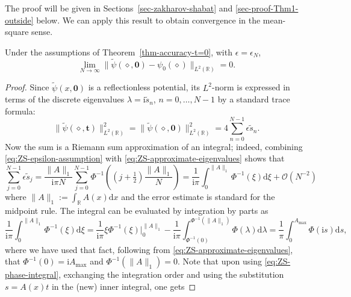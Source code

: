 \documentclass[12pt]{amsart}
\numberwithin{equation}{section}
\newcommand{\dd}{\mathrm{d}}
\newcommand{\ii}{\mathrm{i}}
\newcommand{\SP}{\lambda}
\newcommand{\phaseint}{\Phi}
\newcommand{\R}{\mathbb{R}}
\newcommand{\eps}{\epsilon}
\newcommand{\bigo}[1]{ \mathcal{O}\! \left( #1 \right) }
\begin{document}
The proof will be given in Sections~\ref{sec-zakharov-shabat} and \ref{sec-proof-Thm1-outside} below.  We can apply this result to obtain convergence in the mean-square sense.
\begin{cor}
Under the assumptions of Theorem~\ref{thm-accuracy-t=0}, with $\eps=\eps_N$,
\begin{equation}
\lim_{N\to\infty} \|\widetilde{\psi}(\diamond,\mathbf{0})-\psi_0(\diamond)\|_{L^2(\mathbb{R})}=0.
\label{eq:L2-convergence}
\end{equation}
\label{cor-L2-convergence}
\end{cor}
\begin{proof}
Since $\widetilde{\psi}(x,\mathbf{0})$ is a reflectionless potential, its $L^2$-norm is expressed in terms of the discrete eigenvalues $\lambda=\ii\widetilde{s}_n$, $n=0,\dots,N-1$ by a standard trace formula: 
\begin{equation}
\|\widetilde{\psi}(\diamond,\mathbf{t})\|_{L^2(\mathbb{R})}^2=\|\widetilde{\psi}(\diamond,\mathbf{0})\|_{L^2(\mathbb{R})}^2= 4\sum_{n=0}^{N-1}\epsilon\widetilde{s}_n.
\end{equation}
Now the sum is a Riemann sum approximation of an integral; indeed, combining 
\eqref{eq:ZS-epsilon-assumption} with \eqref{eq:ZS-approximate-eigenvalues} shows that
\begin{equation}
	\sum_{j=0}^{N-1} \eps \widetilde{s}_j = \frac{ \|A \|_1}{\ii \pi N} \sum_{j=0}^{N-1} \phaseint^{-1} \left( (j+\tfrac{1}{2}) \frac{\|A \|_{1}}{ N} \right) 
	= \frac{1}{\ii \pi} \int_0^{\|A\|_{1}} \phaseint^{-1}(\xi) \dd \xi + \bigo{N^{-2}}
	\label{eq:Riemann-Sum}
\end{equation}
where $\|A\|_1 := \int_\R A(x) \dd x$ and the error estimate is standard for the midpoint rule. 
The integral can be evaluated by integration by parts as
\begin{equation}
\frac{1}{\ii \pi} \int_0^{\|A\|_{1}} \phaseint^{-1}(\xi) \dd \xi = \frac{1}{\ii\pi}\xi \phaseint^{-1}(\xi) \Big\vert_{0}^{\|A\|_1} - \frac{1}{\ii\pi}\int_{\phaseint^{-1}(0)}^{\phaseint^{-1}(\|A\|_1)} \phaseint(\SP) \dd \SP = \frac{1}{\pi} \int_0^{A_\text{max}} \phaseint(\ii s) \dd s,
\label{eq:Rewrite-L2-norm}
\end{equation}
where we have used that fact, following from \eqref{eq:ZS-approximate-eigenvalues}, that $\phaseint^{-1}(0) = \ii A_\text{max}$ and $\phaseint^{-1}(\|A\|_1) = 0$. 
Note that upon using \eqref{eq:ZS-phase-integral}, exchanging the integration order and using the substitution $s=A(x)t$ in the (new) inner integral, one gets

\end{proof}
\end{document}
